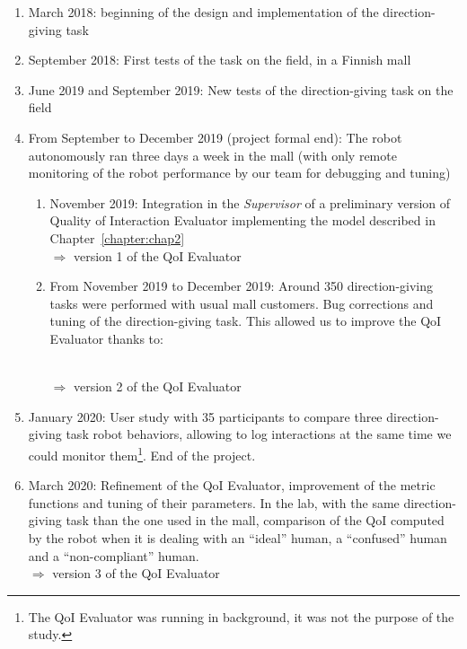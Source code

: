 \documentclass[a4paper,11pt,twoside]{StyleThese}
\begin{document}
\begin{enumerate}
	\item March 2018: beginning of the design and implementation of the direction-giving task
	\item September 2018: First tests of the task on the field, \ie in a Finnish mall
	\item June 2019 and September 2019: New tests of the direction-giving task on the field
	\item From September to December 2019 (project formal end): The robot autonomously ran three days a week in the mall (with only remote monitoring of the robot performance by our team for debugging and tuning)
	\begin{enumerate}
		\item November 2019: Integration in the \emph{Supervisor} of a preliminary version of Quality of Interaction Evaluator implementing the model described in Chapter~\ref{chapter:chap2} \\ $\Longrightarrow$ version 1 of the QoI Evaluator
		\item From November 2019 to December 2019: Around 350 direction-giving tasks were performed with usual mall customers. Bug corrections and tuning of the direction-giving task. This allowed us to improve the QoI Evaluator thanks to:  \\ $\Longrightarrow$ version 2 of the QoI Evaluator\label{list:mall}
	\end{enumerate}
	\item January 2020: User study with 35 participants to compare three direction-giving task robot behaviors, allowing to log interactions at the same time we could monitor them\footnote{The QoI Evaluator was running in background, it was not the purpose of the study.}. End of the project.\label{list:tests}
	\item March 2020: Refinement of the QoI Evaluator, \ie improvement of the metric functions and tuning of their parameters. In the lab, with the same direction-giving task than the one used in the mall, comparison of the QoI computed by the robot when it is dealing with an ``ideal'' human, a ``confused'' human and a ``non-compliant'' human. \\ $\Longrightarrow$ version 3 of the QoI Evaluator\label{list:refin}
\end{enumerate}
\end{document}
